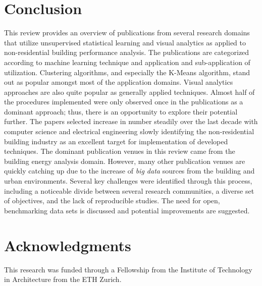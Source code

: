 \documentclass[preprint,12pt,3p]{elsarticle}
\begin{document}
\section{Conclusion}
This review provides an overview of publications from several research domains that utilize unsupervised statistical learning and visual analytics as applied to non-residential building performance analysis. The publications are categorized according to machine learning technique and application and sub-application of utilization. Clustering algorithms, and especially the K-Means algorithm, stand out as popular amongst most of the application domains. Visual analytics approaches are also quite popular as generally applied techniques. Almost half of the procedures implemented were only observed once in the publications as a dominant approach; thus, there is an opportunity to explore their potential further. The papers selected increase in number steadily over the last decade with computer science and electrical engineering slowly identifying the non-residential building industry as an excellent target for implementation of developed techniques. The dominant publication venues in this review came from the building energy analysis domain. However, many other publication venues are quickly catching up due to the increase of \emph{big data} sources from the building and urban environments. Several key challenges were identified through this process, including a noticeable divide between several research communities, a diverse set of objectives, and the lack of reproducible studies. The need for open, benchmarking data sets is discussed and potential improvements are suggested.

\section{Acknowledgments}
This research was funded through a Fellowship from the Institute of Technology in Architecture from the ETH Zurich.




%
% 
% 
% 
% 
% 
% 
% 
% 
% 
% 
% 


\end{document}
